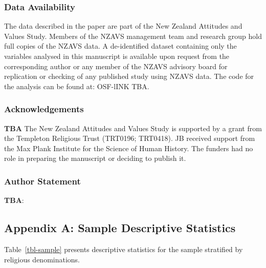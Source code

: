 \documentclass[
  single column]{article}
\begin{document}
\subsubsection{Data Availability}\label{data-availability}

The data described in the paper are part of the New Zealand Attitudes
and Values Study. Members of the NZAVS management team and research
group hold full copies of the NZAVS data. A de-identified dataset
containing only the variables analysed in this manuscript is available
upon request from the corresponding author or any member of the NZAVS
advisory board for replication or checking of any published study using
NZAVS data. The code for the analysis can be found at: OSF-lINK TBA.

\subsubsection{Acknowledgements}\label{acknowledgements}

\textbf{TBA} The New Zealand Attitudes and Values Study is supported by
a grant from the Templeton Religious Trust (TRT0196; TRT0418). JB
received support from the Max Plank Institute for the Science of Human
History. The funders had no role in preparing the manuscript or deciding
to publish it.

\subsubsection{Author Statement}\label{author-statement}

\textbf{TBA}:

\newpage{}

\subsection{Appendix A: Sample Descriptive Statistics}\label{appendix-a}

Table~\ref{tbl-sample} presents descriptive statistics for the sample
stratified by religious denominations.

\newpage{}
\end{document}
